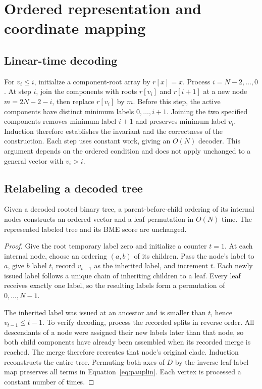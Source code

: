 \section{Ordered representation and coordinate mapping}
\label{sec:gauge}

\subsection{Linear-time decoding}

For $v_i\leq i$, initialize a component-root array by $r[x]=x$.
Process $i=N-2,\ldots,0$.
At step $i$, join the components with roots $r[v_i]$ and $r[i+1]$ at a new node
$m=2N-2-i$, then replace $r[v_i]$ by $m$.
Before this step, the active components have distinct minimum labels $0,\ldots,i+1$.
Joining the two specified components removes minimum label $i+1$ and preserves minimum label $v_i$.
Induction therefore establishes the invariant and the correctness of the construction.
Each step uses constant work, giving an $O(N)$ decoder.
This argument depends on the ordered condition and does not apply unchanged to a general vector with $v_i>i$.

\subsection{Relabeling a decoded tree}

\begin{proposition}
\label{thm:relabel}
Given a decoded rooted binary tree, a parent-before-child ordering of its internal nodes constructs an ordered vector and a leaf permutation in $O(N)$ time.
The represented labeled tree and its BME score are unchanged.
\end{proposition}
\begin{proof}
Give the root temporary label zero and initialize a counter $t=1$.
At each internal node, choose an ordering $(a,b)$ of its children.
Pass the node's label to $a$, give $b$ label $t$, record $v_{t-1}$ as the inherited label, and increment $t$.
Each newly issued label follows a unique chain of inheriting children to a leaf.
Every leaf receives exactly one label, so the resulting labels form a permutation of $0,\ldots,N-1$.

The inherited label was issued at an ancestor and is smaller than $t$, hence $v_{t-1}\leq t-1$.
To verify decoding, process the recorded splits in reverse order.
All descendants of a node were assigned their new labels later than that node, so both child components have already been assembled when its recorded merge is reached.
The merge therefore recreates that node's original clade.
Induction reconstructs the entire tree.
Permuting both axes of $D$ by the inverse leaf-label map preserves all terms in Equation~\eqref{eq:pauplin}.
Each vertex is processed a constant number of times.
\end{proof}

